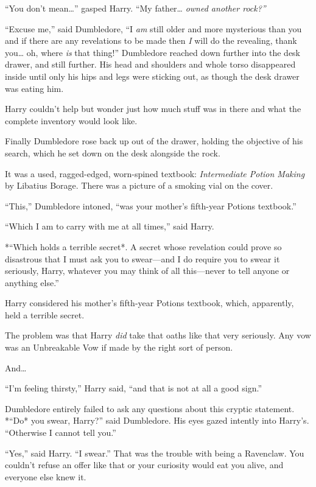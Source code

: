 ``You don't mean\ldots{}'' gasped Harry. ``My father\ldots{} \emph{owned
another rock?''}

``Excuse me,'' said Dumbledore, ``I \emph{am} still older and more
mysterious than you and if there are any revelations to be made then
\emph{I} will do the revealing, thank you\ldots{} oh, where \emph{is}
that thing!'' Dumbledore reached down further into the desk drawer, and
still further. His head and shoulders and whole torso disappeared inside
until only his hips and legs were sticking out, as though the desk
drawer was eating him.

Harry couldn't help but wonder just how much stuff was in there and what
the complete inventory would look like.

Finally Dumbledore rose back up out of the drawer, holding the objective
of his search, which he set down on the desk alongside the rock.

It was a used, ragged-edged, worn-spined textbook: \emph{Intermediate
Potion Making} by Libatius Borage. There was a picture of a smoking vial
on the cover.

``This,'' Dumbledore intoned, ``was your mother's fifth-year Potions
textbook.''

``Which I am to carry with me at all times,'' said Harry.

*``Which holds a terrible secret*. A secret whose revelation could prove
so disastrous that I must ask you to swear---and I do require you to
swear it seriously, Harry, whatever you may think of all this---never to
tell anyone or anything else.''

Harry considered his mother's fifth-year Potions textbook, which,
apparently, held a terrible secret.

The problem was that Harry \emph{did} take that oaths like that very
seriously. Any vow was an Unbreakable Vow if made by the right sort of
person.

And\ldots{}

``I'm feeling thirsty,'' Harry said, ``and that is not at all a good
sign.''

Dumbledore entirely failed to ask any questions about this cryptic
statement. *``Do* you swear, Harry?'' said Dumbledore. His eyes gazed
intently into Harry's. ``Otherwise I cannot tell you.''

``Yes,'' said Harry. ``I swear.'' That was the trouble with being a
Ravenclaw. You couldn't refuse an offer like that or your curiosity
would eat you alive, and everyone else knew it.

